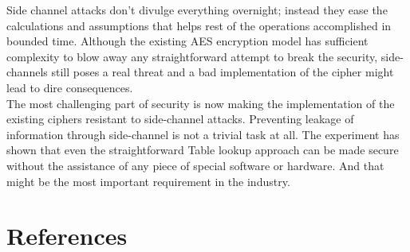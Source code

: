 \documentclass[3p]{elsarticle}
\begin{document}
Side channel attacks don't divulge everything overnight; instead they ease the calculations and assumptions that helps rest of the operations accomplished in bounded time. Although the existing AES encryption model has sufficient complexity to blow away any straightforward attempt to break the security, side-channels still poses a real threat and a bad implementation of the cipher might lead to dire consequences.\\

The most challenging part of security is now making the implementation of the existing ciphers resistant to side-channel attacks. Preventing leakage of information through side-channel is not a trivial task at all. The experiment has shown that even the straightforward Table lookup approach can be made secure without the assistance of any piece of special software or hardware. And that might be the most important requirement in the industry.

\clearpage


\section*{References}
\end{document}
